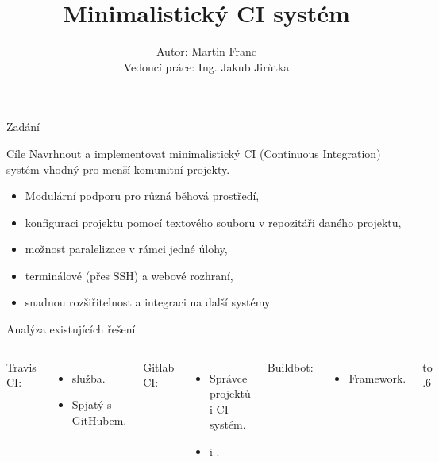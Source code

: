 \documentclass{beamer}
\title{Minimalistický CI systém}
\date{}
\author{Autor: Martin Franc \\ Vedoucí práce: Ing. Jakub Jirůtka \\}
\begin{document}



\maketitle


\begin{frame}{Zadání}
\begin{block}{Cíle}
Navrhnout a implementovat minimalistický CI (Continuous Integration) systém vhodný pro
menší komunitní projekty.
\end{block}
\begin{itemize}
	\item Modulární podporu pro různá běhová prostředí,
	\item konfiguraci projektu pomocí textového souboru v repozitáři daného projektu,
	\item možnost paralelizace v rámci jedné úlohy,
	\item terminálové (přes SSH) a webové rozhraní,
	\item snadnou rozšiřitelnost a integraci na další systémy
\end{itemize}
\end{frame}

\begin{frame}{Analýza existujících řešení}
\begin{columns}[T,onlytextwidth]
	Travis CI:
	\begin{itemize}
		\item {} služba.
		\item Spjatý s GitHubem.
	\end{itemize}
	Gitlab CI:
	\begin{itemize}
		\item Správce projektů i CI systém.
		\item {} i .
	\end{itemize}
	Buildbot:
	\begin{itemize}
		\item Framework.
	\end{itemize}
 	\vbox to .6
\end{columns}
\end{frame}
\end{document}
